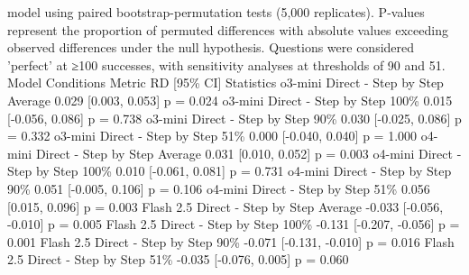 model using paired bootstrap-permutation tests (5,000 replicates). P-values represent the
proportion of permuted differences with absolute values exceeding observed differences under
the null hypothesis. Questions were considered 'perfect' at ≥100 successes, with sensitivity
analyses at thresholds of 90 and 51.
Model
Conditions
Metric
RD [95\% CI]
Statistics
o3-mini
Direct - Step by Step
Average
0.029 [0.003, 0.053]
p = 0.024
o3-mini
Direct - Step by Step
100\%
0.015 [-0.056, 0.086]
p = 0.738
o3-mini
Direct - Step by Step
90\%
0.030 [-0.025, 0.086]
p = 0.332
o3-mini
Direct - Step by Step
51\%
0.000 [-0.040, 0.040]
p = 1.000
o4-mini
Direct - Step by Step
Average
0.031 [0.010, 0.052]
p = 0.003
o4-mini
Direct - Step by Step
100\%
0.010 [-0.061, 0.081]
p = 0.731
o4-mini
Direct - Step by Step
90\%
0.051 [-0.005, 0.106]
p = 0.106
o4-mini
Direct - Step by Step
51\%
0.056 [0.015, 0.096]
p = 0.003
Flash 2.5
Direct - Step by Step
Average
-0.033 [-0.056, -0.010]
p = 0.005
Flash 2.5
Direct - Step by Step
100\%
-0.131 [-0.207, -0.056]
p = 0.001
Flash 2.5
Direct - Step by Step
90\%
-0.071 [-0.131, -0.010]
p = 0.016
Flash 2.5
Direct - Step by Step
51\%
-0.035 [-0.076, 0.005]
p = 0.060

